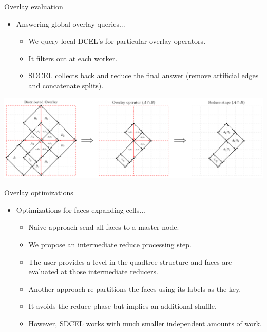 \documentclass{beamer}
\begin{document}
    \begin{frame}{Overlay evaluation}
        \begin{itemize}
            \item Answering global overlay queries...
            \begin{itemize}
                \item We query local DCEL's for particular overlay operators.
                \item It filters out at each worker.
                \item SDCEL collects back and reduce the final answer (remove artificial edges and concatenate splits).
            \end{itemize}
        \end{itemize}
        \vspace{0.5cm}

        \centering
        \includegraphics[width=\textwidth]{figures/overlay_operator}
    \end{frame}

    \begin{frame}{Overlay optimizations}
        \begin{itemize}
            \item Optimizations for faces expanding cells...
                \begin{itemize}
                    \item Naive approach send all faces to a master node.
                    \item We propose an intermediate reduce processing step.
                    \item The user provides a level in the quadtree structure and faces are evaluated at those intermediate reducers.
                    \item Another approach re-partitions the faces using its labels as the key.
                    \item It avoids the reduce phase but implies an additional shuffle.
                    \item However, SDCEL works with much smaller independent amounts of work.
                \end{itemize}
        \end{itemize}
    \end{frame}
\end{document}

